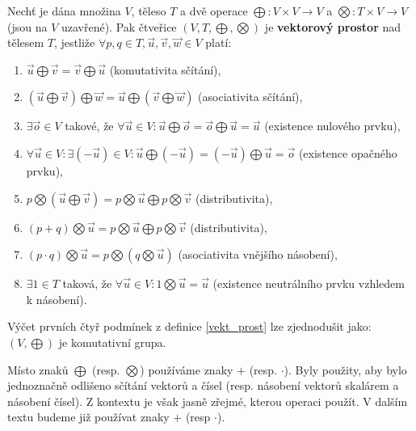 \begin{definition}\label{vekt_prost}
    Nechť je dána množina $V$, těleso $T$ a dvě operace $\bigoplus: V\times V \to V$ a
    $\bigotimes: T\times V \to V$ (jsou na $V$ uzavřené). Pak čtveřice $(V,T,\bigoplus,
    \bigotimes)$ je \textbf{vektorový prostor} nad tělesem $T$, jestliže $\forall p,q \in T, \vec u,
    \vec v, \vec w \in V$ platí:
    \begin{enumerate}[$i.$]
    \item $\vec u \bigoplus \vec v = \vec v \bigoplus \vec u$ (komutativita sčítání),
   	\item $(\vec u \bigoplus \vec v)\bigoplus \vec w = \vec u \bigoplus (\vec v \bigoplus \vec w)$ (asociativita sčítání),
   	\item $\exists \vec o\in V$ takové, že $\forall \vec u\in V:\vec u \bigoplus \vec o = \vec o \bigoplus \vec u = \vec u$ (existence nulového prvku),
   	\item $\forall \vec u \in V: \exists (-\vec u) \in V: \vec u \bigoplus (-\vec u) = (-\vec u) \bigoplus \vec u = \vec o$ (existence opačného prvku),
   	\item $p\bigotimes (\vec u \bigoplus \vec v)=p\bigotimes \vec u \bigoplus p\bigotimes \vec v$ (distributivita),
   	\item $(p+q)\bigotimes \vec u=p\bigotimes \vec u \bigoplus p\bigotimes \vec v$ (distributivita),
   	\item $(p\cdot q)\bigotimes \vec u = p\bigotimes (q\bigotimes \vec u)$ (asociativita vnějšího násobení),
   	\item $\exists 1 \in T$ taková, že $\forall \vec u \in V: 1\bigotimes \vec u = \vec u$ (existence neutrálního prvku vzhledem k násobení).
    \end{enumerate}
\end{definition}

\begin{pozn}
    Výčet prvních čtyř podmínek z definice \ref{vekt_prost} lze zjednodušit jako:
    $(V,\bigoplus)$ je komutativní grupa.
\end{pozn}

\begin{pozn}
    Místo znaků $\bigoplus$ (resp. $\bigotimes$) používáme znaky $+$ (resp. $\cdot$).
    Byly použity, aby bylo jednoznačně odlišeno sčítání vektorů a čísel (resp. násobení
    vektorů skalárem a násobení čísel). Z kontextu je však jasně zřejmé, kterou operaci
    použít. V dalším textu budeme již používat znaky $+$ (resp $\cdot$).
\end{pozn}

